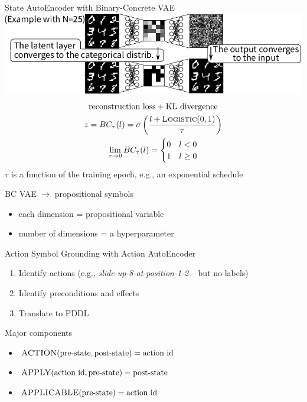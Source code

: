 \documentclass{lecture}
\newcommand{\function}[1]{\textsc{#1}}
\begin{document}
\begin{frame}{State AutoEncoder with Binary-Concrete VAE}
    \includegraphics[width=\textwidth]{img___train-state-ae.pdf}
    \pause
    \begin{gather*}
        \text{reconstruction loss} + \text{KL divergence} \\
        z = BC_\tau(l) = \sigma\left(\frac{l+\function{Logistic}(0, 1)}{\tau}\right) \\
        \lim_{\tau\to0} BC_\tau(l) = \begin{cases} 0 & l<0 \\ 1 & l\geq 0 \end{cases}
    \end{gather*}
    $\tau$ is a function of the training epoch, e.g., an exponential schedule
\end{frame}

\begin{frame}{BC VAE $\to$ propositional symbols}
    \begin{itemize}
        \item each dimension = propositional variable
        \item number of dimensions = a hyperparameter
    \end{itemize}
\end{frame}

\begin{frame}{Action Symbol Grounding with Action AutoEncoder}
    \begin{enumerate}
        \item Identify actions (e.g., \emph{slide-up-8-at-position-1-2} -- but no labels)
        \item Identify preconditions and effects
        \item Translate to PDDL
    \end{enumerate}
\end{frame}

\begin{frame}{Major components}
    \begin{itemize}
        \item $\function{ACTION}(\text{pre-state}, \text{post-state}) = \text{action id}$ 
        \item $\function{APPLY}(\text{action id}, \text{pre-state}) = \text{post-state}$
        \item $\function{APPLICABLE}(\text{pre-state}) = \text{action id}$
    \end{itemize}
\end{frame}
\end{document}
